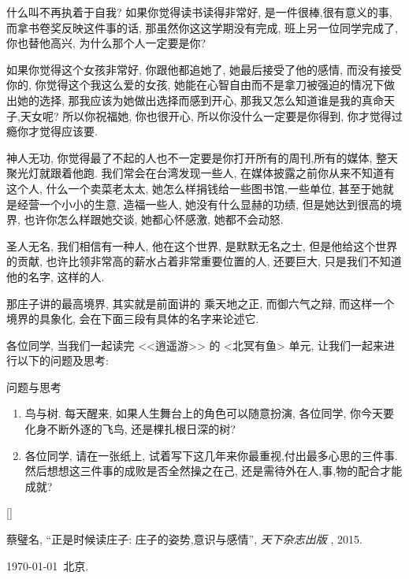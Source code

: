 \documentclass[11pt]{article}
\def\beginrefs{\begin{list}%
		{[\arabic{equation}]}{\usecounter{equation}
			\setlength{\leftmargin}{0.8truecm}\setlength{\labelsep}{0.4truecm}%
			\setlength{\labelwidth}{1.6truecm}}}
\def\endrefs{\end{list}}
\def\bibentry#1{\item[\hbox{[#1]}]}
\begin{document}
什么叫不再执着于自我? 如果你觉得读书读得非常好, 是一件很棒,很有意义的事, 而拿书卷奖反映这件事的话, 那虽然你这这学期没有完成, 班上另一位同学完成了, 你也替他高兴, 为什么那个人一定要是你? 

如果你觉得这个女孩非常好, 你跟他都追她了, 她最后接受了他的感情, 而没有接受你的, 你觉得这个我这么爱的女孩, 她能在心智自由而不是拿刀被强迫的情况下做出她的选择, 那我应该为她做出选择而感到开心, 那我又怎么知道谁是我的真命天子,天女呢? 所以你祝福她, 你也很开心, 所以你没什么一定要是你得到, 你才觉得过瘾你才觉得应该要.

{\color{blue} 神人无功}, 你觉得最了不起的人也不一定要是你打开所有的周刊,所有的媒体, 整天聚光灯就跟着他跑. 我们常会在台湾发现一些人, 在媒体披露之前你从来不知道有这个人, 什么一个卖菜老太太, 她怎么样捐钱给一些图书馆,一些单位, 甚至于她就是经营一个小小的生意, 造福一些人, 她没有什么显赫的功绩, 但是她达到很高的境界, 也许你怎么样跟她交谈, 她都心怀感激, 她都不会动怒.

{\color{blue} 圣人无名}, 我们相信有一种人, 他在这个世界, 是默默无名之士, 但是他给这个世界的贡献, 也许比领非常高的薪水占着非常重要位置的人, 还要巨大, 只是我们不知道他的名字, 这样的人.

那庄子讲的最高境界, 其实就是前面讲的 {\color{blue} 乘天地之正, 而御六气之辩}, 而这样一个境界的具象化, 会在下面三段有具体的名字来论述它.

各位同学, 当我们一起读完 <<逍遥游>> 的 <北冥有鱼> 单元, 让我们一起来进行以下的问题及思考: 

{\Large {\color{purple} 问题与思考}}
\vspace{-0.5cm}

\begin{enumerate}
	\item 鸟与树. 每天醒来, 如果人生舞台上的角色可以随意扮演, 各位同学, 你今天要化身不断外逐的飞鸟, 还是棵扎根日深的树?
	
	\item 各位同学, 请在一张纸上, 试着写下这几年来你最重视,付出最多心思的三件事. 然后想想这三件事的成败是否全然操之在己, 还是需待外在人,事,物的配合才能成就? 
\end{enumerate}

\beginrefs
\bibentry{1}{ 蔡璧名}, 
``正是时候读庄子: 庄子的姿势,意识与感情'',
{\it 天下杂志出版 },
2015.
\endrefs

\begin{flushright}
	\tiny \kaishu \today  \  北京.
\end{flushright}
\end{document}
